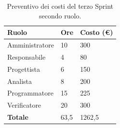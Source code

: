 \begin{table}[ht!]
	\centering
	\begin{tabular}{p{4cm} p{1cm} p{2cm}}
        \toprule
        \textbf{Ruolo} & \textbf{Ore} & \textbf{Costo (€)} \\
        \midrule
        Amministratore & 10 & 300 \\
        Responsabile & 4 & 80 \\
        Progettista & 6 & 150 \\
        Analista & 8 & 200 \\
        Programmatore & 15 & 225 \\
        Verificatore & 20 & 300 \\ %
        \bottomrule
        \textbf{Totale} & 63,5 & 1262,5
    \end{tabular}
    \caption{Preventivo dei costi del terzo Sprint secondo ruolo.}
	\label{table:Preventivo dei costi del terzo Sprint secondo ruolo}
\end{table}
